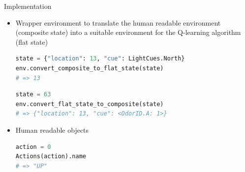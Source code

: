 \documentclass[bigger]{beamer}
\begin{document}
\begin{frame}[<+->][label={sec:orgeaead2b},fragile]{Implementation}
\begin{itemize}
\item Wrapper environment to translate the human readable environment (composite state) into a suitable environment for the Q-learning algorithm (flat state)
\scriptsize
\begin{lstlisting}[language={Python}]
state = {"location": 13, "cue": LightCues.North}
env.convert_composite_to_flat_state(state)
# => 13
\end{lstlisting}
\begin{lstlisting}[language={Python}]
state = 63
env.convert_flat_state_to_composite(state)
# => {"location": 13, "cue": <OdorID.A: 1>}
\end{lstlisting}
\item Human readable objects
\scriptsize
\begin{lstlisting}[language={Python}]
action = 0
Actions(action).name
# => "UP"
\end{lstlisting}
\end{itemize}
\end{frame}
\end{document}
